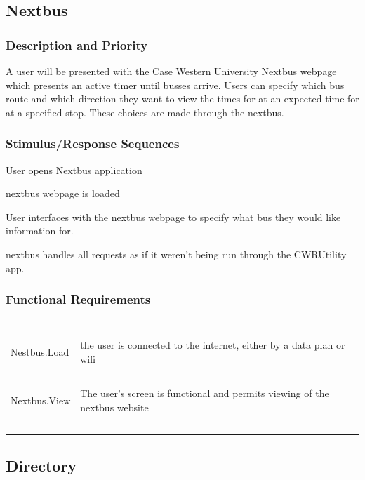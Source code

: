 \documentclass[pdftex,12pt,letter]{article}
\begin{document}
\subsection{Nextbus}
\subsubsection{Description and Priority}
A user will be presented with the Case Western University Nextbus webpage which presents an active timer until busses arrive. Users can specify which bus route and which direction they want to view the times for at an expected time for at a specified stop. These choices are made through the nextbus.

\subsubsection{Stimulus/Response Sequences}
\begin{description}\itemsep1pt
\item[Stimulus:] User opens Nextbus application\\
\item[Response:] nextbus webpage is loaded\\
\item[Stimulus:] User interfaces with the nextbus webpage to specify what bus they would like information for.\\
\item[Response:] nextbus handles all requests as if it weren't being run through the CWRUtility app.\\
\end{description}
\subsubsection{Functional Requirements}
\begin{table}[!h]
\begin{tabularx}{\textwidth }[t]{|l Y|}
\hline
~&~\\
Nestbus.Load &  the user is connected to the internet, either by a data plan or wifi\\ 
~&~\\
Nextbus.View & The user's screen is functional and permits viewing of the nextbus website \\
~&~\\
\hline
\end{tabularx}
\end{table}


\subsection{Directory}
\end{document}
